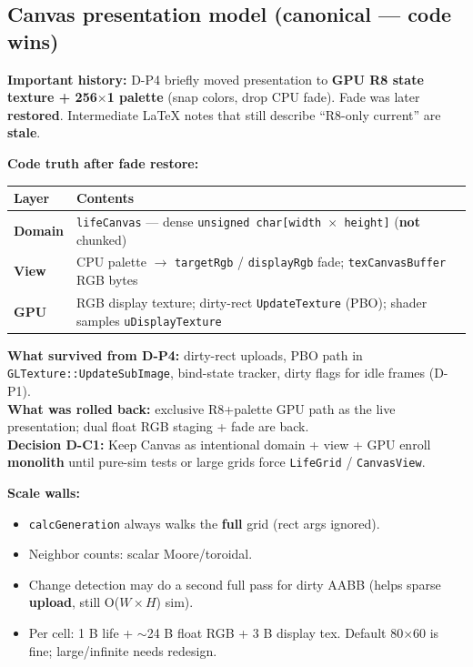 \documentclass[10pt,a4paper]{article}
\begin{document}
\subsection{Canvas presentation model (canonical --- code wins)}
\textbf{Important history:} D-P4 briefly moved presentation to \textbf{GPU R8 state texture + 256$\times$1 palette} (snap colors, drop CPU fade). Fade was later \textbf{restored}. Intermediate LaTeX notes that still describe ``R8-only current'' are \textbf{stale}.

\noindent \textbf{Code truth after fade restore:}
\begin{table}[h!]
\centering
\small
\begin{tabularx}{\textwidth}{l X}
\toprule
\textbf{Layer} & \textbf{Contents} \\
\midrule
\textbf{Domain} & \texttt{lifeCanvas} --- dense \texttt{unsigned char[width $\times$ height]} (\textbf{not} chunked) \\
\textbf{View} & CPU palette $\rightarrow$ \texttt{targetRgb} / \texttt{displayRgb} fade; \texttt{texCanvasBuffer} RGB bytes \\
\textbf{GPU} & RGB display texture; dirty-rect \texttt{UpdateTexture} (PBO); shader samples \texttt{uDisplayTexture} \\
\bottomrule
\end{tabularx}
\end{table}

\noindent \textbf{What survived from D-P4:} dirty-rect uploads, PBO path in \texttt{GLTexture::UpdateSubImage}, bind-state tracker, dirty flags for idle frames (D-P1).\\
\textbf{What was rolled back:} exclusive R8+palette GPU path as the live presentation; dual float RGB staging + fade are back.\\
\textbf{Decision D-C1:} Keep Canvas as intentional domain + view + GPU enroll \textbf{monolith} until pure-sim tests or large grids force \texttt{LifeGrid} / \texttt{CanvasView}.

\noindent \textbf{Scale walls:}
\begin{itemize}
    \item \texttt{calcGeneration} always walks the \textbf{full} grid (rect args ignored).
    \item Neighbor counts: scalar Moore/toroidal.
    \item Change detection may do a second full pass for dirty AABB (helps sparse \textbf{upload}, still O($W \times H$) sim).
    \item Per cell: 1 B life + $\sim$24 B float RGB + 3 B display tex. Default 80$\times$60 is fine; large/infinite needs redesign.
\end{itemize}
\end{document}
